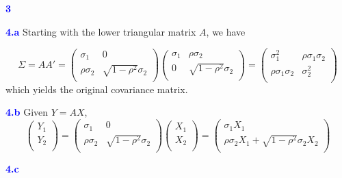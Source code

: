 \documentclass[a4paper,11pt] {article}
\begin{document}
\textcolor{blue}{\bf 3 }

\textcolor{blue}{\bf 4.a } Starting with the lower triangular matrix $A$, we have

$$
\Sigma = AA' = 
\left(
  \begin{array}{cc}
    \sigma_1 & 0 \\
    \rho \sigma_2 & \sqrt{1-\rho^2}\sigma_2 \\
  \end{array}
\right)
\left(
  \begin{array}{cc}
    \sigma_1 & \rho \sigma_2 \\
    0 & \sqrt{1-\rho^2}\sigma_2 \\
  \end{array}
\right)
=
\left(
  \begin{array}{cc}
    \sigma_1^2 & \rho \sigma_1 \sigma_2 \\
    \rho \sigma_1 \sigma_2 & \sigma_2^2 \\
  \end{array}
\right)
$$
which yields the original covariance matrix. 

\textcolor{blue}{\bf 4.b } Given $Y = AX$, 
$$
\left(
  \begin{array}{c}
    Y_1 \\
    Y_2 \\
  \end{array}
\right)
=
\left(
  \begin{array}{cc}
    \sigma_1 & 0 \\
    \rho \sigma_2 & \sqrt{1-\rho^2}\sigma_2 \\
  \end{array}
\right)
\left(
  \begin{array}{c}
    X_1 \\
    X_2 \\
  \end{array}
\right)
=
\left(
  \begin{array}{c}
    \sigma_1 X_1 \\
    \rho \sigma_2 X_1 + \sqrt{1-\rho^2} \sigma_2 X_2 \\
  \end{array}
\right)
$$

\textcolor{blue}{\bf 4.c }

%
\end{document}
